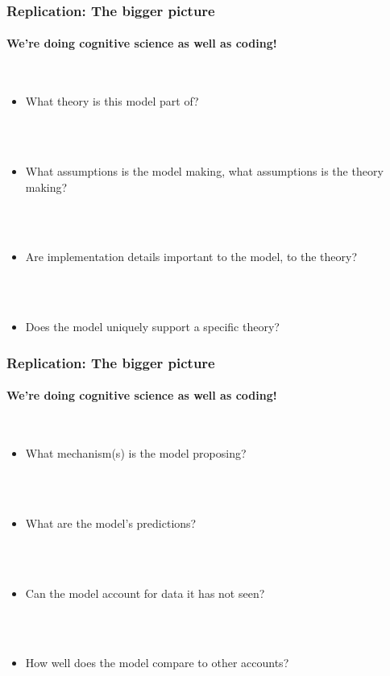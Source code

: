 \documentclass{beamer}
\begin{document}
\begin{frame}[fragile]
\frametitle{Replication: The bigger picture}
\framesubtitle{We're doing cognitive science as well as coding!}
        \  \\

\begin{itemize}
\item<2-> What theory is this model part of?

\ \\

\ \\

 \item <3-> What assumptions is the model making, what assumptions is the theory making?
 
\ \\

 \ \\
 
\item<4-> Are implementation details important to the model, to the theory? 

 
\ \\

 \ \\
 
\item<5-> Does the model uniquely support a specific theory? 
\end{itemize}


\end{frame}
\begin{frame}[fragile]
\frametitle{Replication: The bigger picture}
\framesubtitle{We're doing cognitive science as well as coding!}
        \  \\

\begin{itemize}
\item<2-> What mechanism(s) is the model proposing?

\ \\

\ \\

 \item <3-> What are the model's predictions? 
 
\ \\

 \ \\
 
\item<4-> Can the model account for data it has not seen?

 
\ \\

 \ \\
 
\item<5-> How well does the model compare to other accounts?
\end{itemize}


\end{frame}
\end{document}
